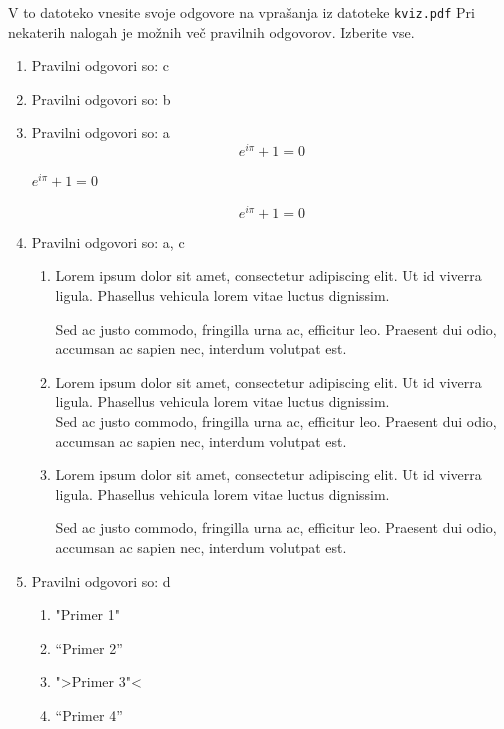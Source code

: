 \documentclass[11pt]{article}
\begin{document}
V to datoteko vnesite svoje odgovore na vprašanja iz datoteke \texttt{kviz.pdf}
Pri nekaterih nalogah je možnih več pravilnih odgovorov. Izberite vse.

\begin{enumerate}
    \item Pravilni odgovori so: c %
    
    \item Pravilni odgovori so: b %
    
    \item Pravilni odgovori so: a  %
      \[ e^{i \pi} + 1 = 0 \]
      \begin{center}
          \( e^{i \pi} + 1 = 0 \)
      \end{center}
      \begin{equation*}
          e^{i \pi} + 1 = 0
      \end{equation*}

    \item Pravilni odgovori so: a, c%
        \begin{enumerate}
            \item {
Lorem ipsum dolor sit amet, consectetur adipiscing 
elit. Ut id viverra ligula. Phasellus vehicula lorem 
vitae luctus dignissim. 
                
Sed ac justo commodo, fringilla urna ac, efficitur 
leo. Praesent dui odio, accumsan ac sapien nec, 
interdum volutpat est. 
            }
            \item {
Lorem ipsum dolor sit amet, consectetur adipiscing 
elit. Ut id viverra ligula. Phasellus vehicula lorem 
vitae luctus dignissim. \\
Sed ac justo commodo, fringilla urna ac, efficitur 
leo. Praesent dui odio, accumsan ac sapien nec, 
interdum volutpat est.             }
            \item {
Lorem ipsum dolor sit amet, consectetur adipiscing 
elit. Ut id viverra ligula. Phasellus vehicula lorem 
vitae luctus dignissim. \par
Sed ac justo commodo, fringilla urna ac, efficitur 
leo. Praesent dui odio, accumsan ac sapien nec, 
interdum volutpat est.             }
        \end{enumerate}
    
      \item Pravilni odgovori so: d %
        \begin{enumerate}
          \item "Primer 1"
          \item ``Primer 2''
          \item ">Primer 3"<
          \item "`Primer 4"'
        \end{enumerate}


\end{enumerate}
\end{document}

